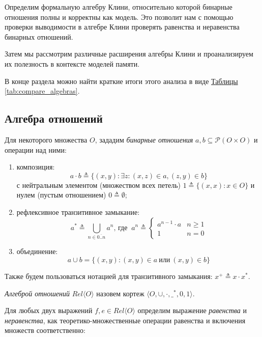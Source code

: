 \documentclass[times
              ,specification
              ,annotation
              ]{itmo-student-thesis}
\begin{document}
    Определим формальную алгебру Клини, относительно которой бинарные отношения полны и корректны как модель.
    Это позволит нам с помощью проверки выводимости в алгебре Клини проверять равенства и неравенства бинарных отношений.

    Затем мы рассмотрим различные расширения алгебры Клини и проанализируем их полезность в контексте
    моделей памяти.

    В конце раздела можно найти краткие итоги этого анализа в виде
    \hyperref[tab:compare_algebras]{Таблицы \ref{tab:compare_algebras}}.

    \subsection{Алгебра отношений}
      Для некоторого множества $ O $, зададим \textit{бинарные отношения}
      $ a, b \subseteq \mathcal{P}(O \times O) $
      и операции над ними:
      \begin{enumerate}
        \item композиция:
         $$a \cdot b \triangleq \{ (x, y) : \exists z : (x, z) \in a, (z, y) \in b \} $$
        с нейтральным элементом (множеством всех петель) $ 1 \triangleq \{(x, x) : x \in O\} $
        и нулем (пустым отношением) $ 0 \triangleq \emptyset $;
        \item рефлексивное транзитивное замыкание:
        $$ a^* \triangleq \bigcup\limits_{n \in \overline{0..n}} a^n
        \text{, где}\;\;
        a^n \triangleq \begin{cases}
          a^{n-1} \cdot a & n \ge 1\\
          1          & n = 0
        \end{cases}
        $$
       \item объединение:
       $$ a \cup b = \{(x, y) : (x, y) \in a ~\text{или}~ (x, y) \in b \} $$

      \end{enumerate}
      Также будем пользоваться нотацией для транзитивного замыкания: $ x^+ \triangleq x \cdot x^*$.

      \textit{Алгеброй отношений} $\mathit{Rel}\langle O \rangle$
      назовем кортеж  $\langle O, \cup, \cdot, \_^* , 0, 1\rangle $.

      Для любых двух выражений $ f, e \in \mathit{Rel}\langle O \rangle$ определим выражение \textit{равенства} и
      \textit{неравенства}, как теоретико-множественные операции равенства и включения множеств
      соответственно:
\end{document}
